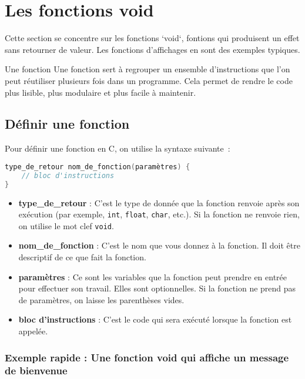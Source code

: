 
\section{Les fonctions void}

Cette section se concentre sur les fonctions `void`, fontions qui produisent un effet sans retourner de valeur. Les fonctions d'affichages en sont des exemples typiques.

\begin{UPSTIinfor}{Une fonction}
	Une fonction sert à regrouper un ensemble d'instructions que l'on peut réutiliser plusieurs fois dans un programme. Cela permet de rendre le code plus lisible, plus modulaire et plus facile à maintenir.
\end{UPSTIinfor}

\subsection{Définir une fonction}
Pour définir une fonction en C, on utilise la syntaxe suivante :

\begin{lstlisting}[language=c]
type_de_retour nom_de_fonction(paramètres) {
    // bloc d'instructions
}
\end{lstlisting}

\begin{itemize}
	\item \textbf{type\_de\_retour} : C'est le type de donnée que la fonction renvoie après son exécution (par exemple, \texttt{int}, \texttt{float}, \texttt{char}, etc.). Si la fonction ne renvoie rien, on utilise le mot clef \texttt{void}.
	\item \textbf{nom\_de\_fonction} : C'est le nom que vous donnez à la fonction. Il doit être descriptif de ce que fait la fonction.
	\item \textbf{paramètres} : Ce sont les variables que la fonction peut prendre en entrée pour effectuer son travail. Elles sont optionnelles. Si la fonction ne prend pas de paramètres, on laisse les parenthèses vides.
	\item \textbf{bloc d'instructions} : C'est le code qui sera exécuté lorsque la fonction est appelée.
\end{itemize}

\subsubsection{Exemple rapide : Une fonction void qui affiche un message de bienvenue}

